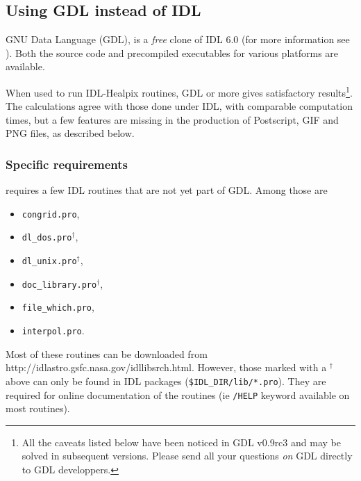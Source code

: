 \documentclass[12pt,twoside]{article}
\begin{document}
\subsection{Using GDL instead of IDL}
\label{sec:using_gdl}

GNU Data Language (GDL), is a {\em free} clone of IDL 6.0 (for more information see
).
Both the source code and precompiled executables for various platforms are available.

When used to run IDL-Healpix routines, GDL \gdlversion or more gives
satisfactory results\footnote{All the caveats listed below have been noticed in GDL v0.9rc3
and may be solved in subsequent versions. Please send all your questions
{\em on} GDL directly to GDL developpers.}. The calculations agree with those done under IDL, with
comparable computation times, but a few features are missing in the production
of Postscript, GIF and PNG files, as described below.



\subsubsection{Specific requirements}

\healpix requires a few IDL routines that are not yet part of GDL.
Among those are \begin{itemize}
\item {\tt congrid.pro},
\item {\tt dl\_dos.pro}$^\dagger$,
\item {\tt dl\_unix.pro}$^\dagger$,
\item {\tt doc\_library.pro}$^\dagger$,
\item {\tt file\_which.pro},
\item {\tt interpol.pro}.
		\end{itemize}
Most of these routines can be downloaded from
{http://idlastro.gsfc.nasa.gov/idllibsrch.html}.
However, those marked with a $^\dagger$ above can only be found in IDL packages
({\tt \$IDL\_DIR/lib/*.pro}). They are required for online documentation of the
\healpix routines (ie {\tt /HELP} keyword available on most routines).



\end{document}
